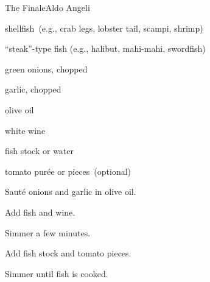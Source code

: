 \begin{recipe}{The Finale}{Aldo Angeli}{}

\begin{ingredients}
\item shellfish~(e.g., crab legs, lobster tail, scampi, shrimp)
\item ``steak''-type fish (e.g., halibut, mahi-mahi, swordfish)
\item green onions, chopped
\item garlic, chopped
\item olive oil
\item \C{\half} white wine
\item \C{\half} fish stock or water
\item tomato pur\'ee or pieces~(optional)
\end{ingredients}

\begin{directions}
\item Saut\'e onions and garlic in olive oil.
\item Add fish and wine.
\item Simmer a few minutes.
\item Add fish stock and tomato pieces.
\item Simmer until fish is cooked.
\end{directions}

\end{recipe}

